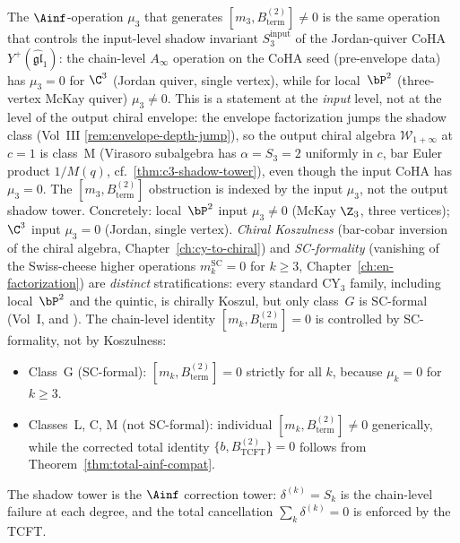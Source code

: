 \begin{remark}
\label{rem:m3b2-shadow-tower}
The $\Ainf$-operation $\mu_3$ that generates
$[m_3, B^{(2)}_{\mathrm{term}}] \neq 0$ is the same operation that controls
the input-level shadow invariant $S_3^{\mathrm{input}}$ of the
Jordan-quiver CoHA $Y^+(\widehat{\mathfrak{gl}}_1)$: the chain-level
$A_\infty$ operation on the CoHA seed (pre-envelope data) has
$\mu_3 = 0$ for $\C^3$ (Jordan quiver, single vertex), while for
local~$\bP^2$ (three-vertex McKay quiver) $\mu_3 \neq 0$. This is
a statement at the \emph{input} level, not at the level of the output
chiral envelope: the envelope factorization jumps the shadow class
(Vol~III \ref{rem:envelope-depth-jump}), so the output chiral
algebra $\mathcal{W}_{1+\infty}$ at $c = 1$ is class~M (Virasoro
subalgebra has $\alpha = S_3 = 2$ uniformly in $c$, bar Euler product
$1/M(q)$, cf.~\ref{thm:c3-shadow-tower}), even though the input
CoHA has $\mu_3 = 0$. The $[m_3, B^{(2)}_{\mathrm{term}}]$ obstruction is indexed
by the input $\mu_3$, not the output shadow tower.
Concretely:
local~$\bP^2$ input $\mu_3 \neq 0$ (McKay $\Z_3$, three vertices);
$\C^3$ input $\mu_3 = 0$ (Jordan, single vertex). \emph{Chiral Koszulness} (bar-cobar
inversion of the chiral algebra, Chapter~\ref{ch:cy-to-chiral})
and \emph{SC-formality} (vanishing of the Swiss-cheese higher
operations $m_k^{\mathrm{SC}} = 0$ for $k \geq 3$,
Chapter~\ref{ch:en-factorization}) are \emph{distinct}
stratifications: every standard CY$_3$ family, including
local~$\bP^2$ and the quintic, is chirally Koszul, but only
class~$G$ is SC-formal (Vol~I,
\cite{VolI} and
\cite{VolI}). The chain-level identity
$[m_k, B^{(2)}_{\mathrm{term}}] = 0$ is controlled by SC-formality, not by
Koszulness:
\begin{itemize}
 \item Class~G (SC-formal): $[m_k, B^{(2)}_{\mathrm{term}}] = 0$ strictly for
 all $k$, because $\mu_k = 0$ for $k \geq 3$.
 \item Classes~L, C, M (not SC-formal): individual
 $[m_k, B^{(2)}_{\mathrm{term}}] \neq 0$ generically, while the
 corrected total identity $\{b, B^{(2)}_{\mathrm{TCFT}}\}=0$
 follows from
 Theorem~\ref{thm:total-ainf-compat}.
\end{itemize}
The shadow tower is the $\Ainf$ correction tower:
$\delta^{(k)} = S_k$ is the chain-level failure at each degree,
and the total cancellation $\sum_k \delta^{(k)} = 0$ is enforced
by the TCFT.
\end{remark}

